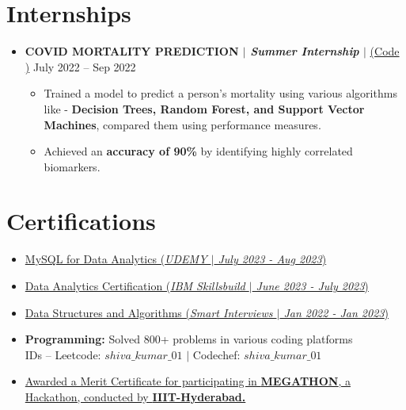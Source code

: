 \documentclass[letterpaper,5pt]{article}
\begin{document}
    \section{Internships}
    \begin{itemize}
        \item[]
            \textbf{COVID MORTALITY PREDICTION $|$ \emph{Summer Internship} $|$} 
            \href{https://github.com/GSK-10/Covid_Mortality_Prediction}{({Code} \faExternalLink*)} \hfill July 2022 -- Sep 2022
            \begin{itemize}
                \item[\textbullet] Trained a model to predict a person's mortality using various algorithms like - \textbf{Decision Trees, Random Forest, and Support Vector Machines}, compared them using performance measures.
                \item[\textbullet] Achieved an \textbf{accuracy of 90\%} by identifying highly correlated biomarkers.
            \end{itemize}
    \end{itemize}
    
    \section{Certifications}
    \begin{itemize}[leftmargin=0.15in,label={}]
      \item[\textbullet{}]\href{https://}{MySQL for Data Analytics (\emph{UDEMY $|$ July 2023 - Aug 2023})} \faExternalLink* \\
      \item[\textbullet{}]\href{https://}{Data Analytics Certification (\emph{IBM Skillsbuild $|$ June 2023 - July 2023})} \faExternalLink* \\
      \item[\textbullet{}]\href{https://}{Data Structures and Algorithms (\emph{Smart Interviews $|$ Jan 2022 - Jan 2023})} \faExternalLink* \\
      \item[\textbullet{}]\textbf{Programming:} Solved 800+ problems in various coding platforms \\
        IDs -- Leetcode: \href{https://leetcode.com/shiva_kumar_01}{{\bf$shiva\_kumar\_01$}} \faExternalLink* $|$ 
        Codechef: \href{https://www.codechef.com/users/shiva_kumar_01}{{\bf$shiva\_kumar\_01$}} \faExternalLink* \\
      \item[\textbullet{}]\href{https://drive.google.com/file/d/1e3po31SH4F8SK9jfTujhWRTyP6mIwR3i/view?usp=sharing}{Awarded a Merit Certificate for participating in {\bf MEGATHON}, a Hackathon, conducted by {\ttfamily\bfseries IIIT-Hyderabad.}} \faExternalLink*
    \end{itemize}
    
\end{document}
